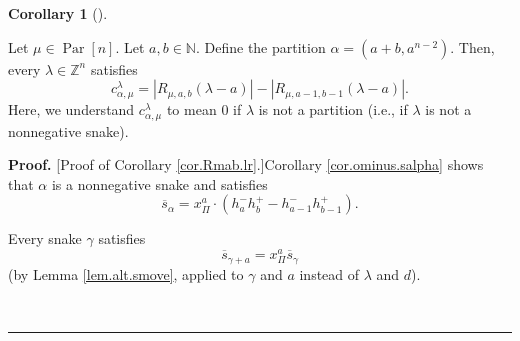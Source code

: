 \documentclass[numbers=enddot,12pt,final,onecolumn,notitlepage]{scrartcl}%
\theoremstyle{definition}
\newtheorem{coro}[theo]{Corollary}
\newenvironment{corollary}[1][]
{\begin{coro}[#1]\begin{leftbar}}
{\end{leftbar}\end{coro}}
\newenvironment{proof}[1][Proof]{\noindent\textbf{#1.} }{\ \rule{0.5em}{0.5em}}
\begin{document}
\begin{corollary}
\label{cor.Rmab.lr}Let $\mu\in\operatorname*{Par}\left[  n\right]  $. Let
$a,b\in\mathbb{N}$. Define the partition $\alpha=\left(  a+b,a^{n-2}\right)
$. Then, every $\lambda\in\mathbb{Z}^{n}$ satisfies%
\begin{equation}
c_{\alpha,\mu}^{\lambda}=\left\vert R_{\mu,a,b}\left(  \lambda-a\right)
\right\vert -\left\vert R_{\mu,a-1,b-1}\left(  \lambda-a\right)  \right\vert .
\label{eq.cor.Rmab.lr.eq}%
\end{equation}
Here, we understand $c_{\alpha,\mu}^{\lambda}$ to mean $0$ if $\lambda$ is not
a partition (i.e., if $\lambda$ is not a nonnegative snake).
\end{corollary}

\begin{proof}
[Proof of Corollary \ref{cor.Rmab.lr}.]Corollary \ref{cor.ominus.salpha} shows
that $\alpha$ is a nonnegative snake and satisfies
\begin{equation}
\overline{s}_{\alpha}=x_{\Pi}^{a}\cdot\left(  h_{a}^{-}h_{b}^{+}-h_{a-1}%
^{-}h_{b-1}^{+}\right)  . \label{pf.cor.Rmab.lr.1}%
\end{equation}


Every snake $\gamma$ satisfies%
\begin{equation}
\overline{s}_{\gamma+a}=x_{\Pi}^{a}\overline{s}_{\gamma}
\label{pf.cor.Rmab.lr.2}%
\end{equation}
(by Lemma \ref{lem.alt.smove}, applied to $\gamma$ and $a$ instead of
$\lambda$ and $d$).


\end{proof}
\end{document}
